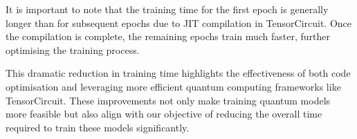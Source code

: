 It is important to note that the training time for the first epoch is
generally longer than for subsequent epochs due to \gls{JIT}
compilation in TensorCircuit. Once the compilation is complete, the
remaining epochs train much faster, further optimising the training process.

This dramatic reduction in training time highlights the effectiveness
of both code optimisation and leveraging more efficient quantum
computing frameworks like TensorCircuit. These improvements not only
make training quantum models more feasible but also align with our
objective of reducing the overall time required to train these models
significantly.
